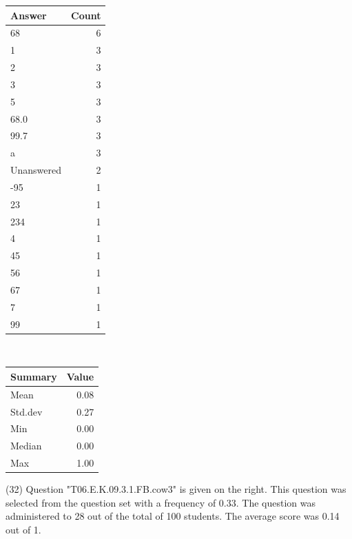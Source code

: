 \documentclass[12pt,nohyper]{tufte-handout}\usepackage[]{graphicx}\usepackage[]{color}
\begin{document}
\begin{center}%
\begin{tabular}{lr}
  \hline
Answer & Count \\ 
  \hline
68 &   6 \\ 
  1 &   3 \\ 
  2 &   3 \\ 
  3 &   3 \\ 
  5 &   3 \\ 
  68.0 &   3 \\ 
  99.7 &   3 \\ 
  a &   3 \\ 
  Unanswered &   2 \\ 
  -95 &   1 \\ 
  23 &   1 \\ 
  234 &   1 \\ 
  4 &   1 \\ 
  45 &   1 \\ 
  56 &   1 \\ 
  67 &   1 \\ 
  7 &   1 \\ 
  99 &   1 \\ 
   \hline
\end{tabular}
~~~~~~~~%
\begin{tabular}{lr}
  \hline
Summary & Value \\ 
  \hline
Mean & 0.08 \\ 
  Std.dev & 0.27 \\ 
  Min & 0.00 \\ 
  Median & 0.00 \\ 
  Max & 1.00 \\ 
   \hline
\end{tabular}
\end{center}\newpage{} (32) Question "T06.E.K.09.3.1.FB.cow3" is given on the right. This question was selected from the question set with a frequency of 0.33. The question was administered to 28 out of the total of 100 students. The average score was 0.14 out of 1.
\end{document}

